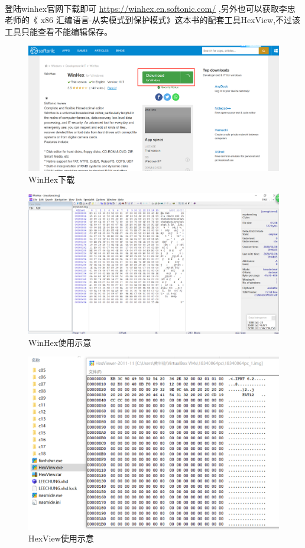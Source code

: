 \documentclass[12pt]{article}
\begin{document}
	\paragraph{}登陆winhex官网下载即可 \url{https://winhex.en.softonic.com/} ,另外也可以获取李忠老师的《 x86 汇编语言-从实模式到保护模式》这本书的配套工具HexView,不过该工具只能查看不能编辑保存。
		\begin{figure}[H]
			\centering
			\includegraphics[width=14cm]{./figures/WinHex.png}
			\caption{WinHex下载} 
		\end{figure}
		\begin{figure}[H]
			\centering
			\includegraphics[width=14cm]{./figures/winhexuse.png}
			\caption{WinHex使用示意} 
		\end{figure}
		\begin{figure}[H]
			\centering
			\includegraphics[width=12cm]{./figures/HexViewer.png}
			\caption{HexView使用示意} 
		\end{figure}
\end{document}
